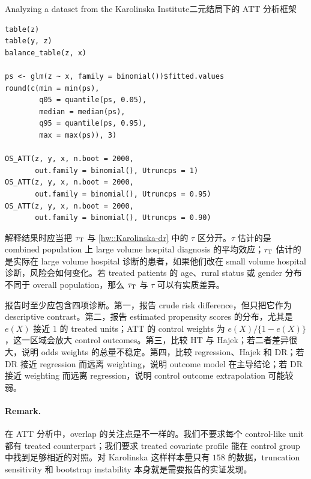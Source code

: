 \begin{exercisesolution}{Analyzing a dataset from the Karolinska Institute}{二元结局下的 ATT 分析框架}
\begin{lstlisting}
table(z)
table(y, z)
balance_table(z, x)

ps <- glm(z ~ x, family = binomial())$fitted.values
round(c(min = min(ps),
        q05 = quantile(ps, 0.05),
        median = median(ps),
        q95 = quantile(ps, 0.95),
        max = max(ps)), 3)

OS_ATT(z, y, x, n.boot = 2000,
       out.family = binomial(), Utruncps = 1)
OS_ATT(z, y, x, n.boot = 2000,
       out.family = binomial(), Utruncps = 0.95)
OS_ATT(z, y, x, n.boot = 2000,
       out.family = binomial(), Utruncps = 0.90)
\end{lstlisting}

解释结果时应当把 $\tau_\textsc{T}$ 与 \cref{hw::Karolinska-dr} 中的 $\tau$ 区分开。$\tau$ 估计的是 combined population 上 large volume hospital diagnosis 的平均效应；$\tau_\textsc{T}$ 估计的是实际在 large volume hospital 诊断的患者，如果他们改在 small volume hospital 诊断，风险会如何变化。若 treated patients 的 age、rural status 或 gender 分布不同于 overall population，那么 $\tau_\textsc{T}$ 与 $\tau$ 可以有实质差异。

报告时至少应包含四项诊断。第一，报告 crude risk difference，但只把它作为 descriptive contrast。第二，报告 estimated propensity scores 的分布，尤其是 $e(X)$ 接近 $1$ 的 treated units；ATT 的 control weights 为 $e(X)/\{1-e(X)\}$，这一区域会放大 control outcomes。第三，比较 HT 与 Hajek；若二者差异很大，说明 odds weights 的总量不稳定。第四，比较 regression、Hajek 和 DR；若 DR 接近 regression 而远离 weighting，说明 outcome model 在主导结论；若 DR 接近 weighting 而远离 regression，说明 control outcome extrapolation 可能较弱。

\paragraph{Remark.}
在 ATT 分析中，overlap 的关注点是不一样的。我们不要求每个 control-like unit 都有 treated counterpart；我们要求 treated covariate profile 能在 control group 中找到足够相近的对照。对 Karolinska 这样样本量只有 $158$ 的数据，truncation sensitivity 和 bootstrap instability 本身就是需要报告的实证发现。
\end{exercisesolution}
